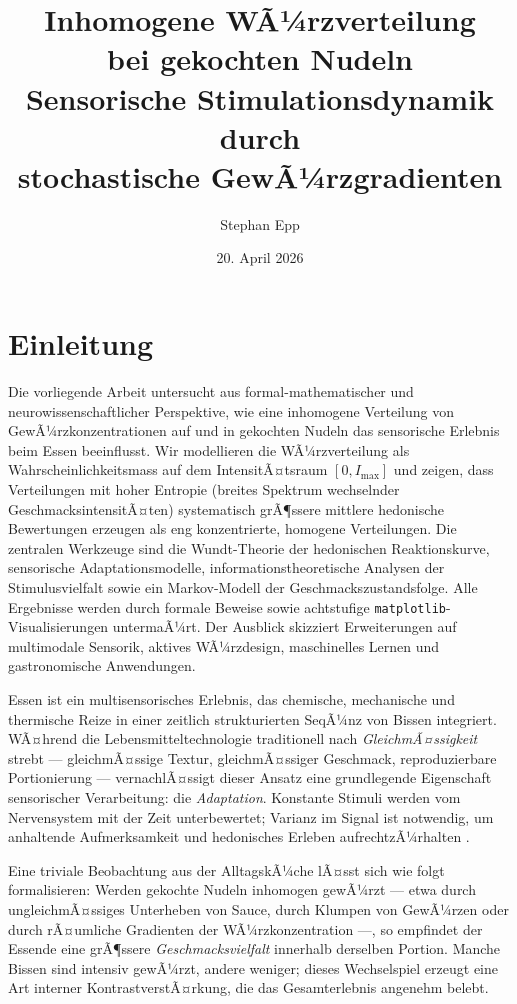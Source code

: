 ﻿\documentclass[12pt,a4paper]{article}
\title{\textbf{Inhomogene WÃ¼rzverteilung\\ bei gekochten Nudeln}\\[-0.1em] \Large Sensorische Stimulationsdynamik durch\\ stochastische GewÃ¼rzgradienten}
\author{Stephan Epp}
\date{20. April 2026}
\theoremstyle{definition}
\begin{document}
\maketitle
\tableofcontents
\newpage

\section{Einleitung}
Die vorliegende Arbeit untersucht aus formal-mathematischer und
neurowissenschaftlicher Perspektive, wie eine inhomogene Verteilung von
GewÃ¼rzkonzentrationen auf und in gekochten Nudeln das sensorische Erlebnis
beim Essen beeinflusst. Wir modellieren die WÃ¼rzverteilung als
Wahrscheinlichkeitsmass auf dem IntensitÃ¤tsraum $[0, I_{\max}]$ und
zeigen, dass Verteilungen mit hoher Entropie (breites Spektrum wechselnder
GeschmacksintensitÃ¤ten) systematisch grÃ¶ssere mittlere hedonische
Bewertungen erzeugen als eng konzentrierte, homogene Verteilungen. Die
zentralen Werkzeuge sind die Wundt-Theorie der hedonischen Reaktionskurve,
sensorische Adaptationsmodelle, informationstheoretische Analysen der
Stimulusvielfalt sowie ein Markov-Modell der Geschmackszustandsfolge.
Alle Ergebnisse werden durch formale Beweise sowie achtstufige
\texttt{matplotlib}-Visualisierungen untermaÃ¼rt. Der Ausblick skizziert
Erweiterungen auf multimodale Sensorik, aktives WÃ¼rzdesign, maschinelles
Lernen und gastronomische Anwendungen.

Essen ist ein multisensorisches Erlebnis, das chemische, mechanische und
thermische Reize in einer zeitlich strukturierten SeqÃ¼nz von Bissen
integriert. WÃ¤hrend die Lebensmitteltechnologie traditionell nach
\emph{GleichmÃ¤ssigkeit} strebt --- gleichmÃ¤ssige Textur, gleichmÃ¤ssiger
Geschmack, reproduzierbare Portionierung --- vernachlÃ¤ssigt dieser Ansatz
eine grundlegende Eigenschaft sensorischer Verarbeitung: die \emph{Adaptation}.
Konstante Stimuli werden vom Nervensystem mit der Zeit unterbewertet; Varianz
im Signal ist notwendig, um anhaltende Aufmerksamkeit und hedonisches Erleben
aufrechtzÃ¼rhalten \cite{rolls2007,kringelbach2015}.

Eine triviale Beobachtung aus der AlltagskÃ¼che lÃ¤sst sich wie folgt
formalisieren: Werden gekochte Nudeln inhomogen gewÃ¼rzt --- etwa durch
ungleichmÃ¤ssiges Unterheben von Sauce, durch Klumpen von GewÃ¼rzen oder
durch rÃ¤umliche Gradienten der WÃ¼rzkonzentration ---, so empfindet der
Essende eine grÃ¶ssere \emph{Geschmacksvielfalt} innerhalb derselben Portion.
Manche Bissen sind intensiv gewÃ¼rzt, andere weniger; dieses Wechselspiel
erzeugt eine Art interner KontrastverstÃ¤rkung, die das Gesamterlebnis
angenehm belebt.
\end{document}
